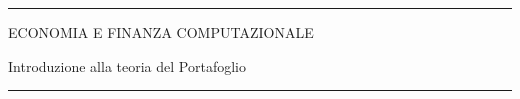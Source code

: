\documentclass[12pt,aspectratio=169]{beamer}
\begin{document}
\begin{frame}
\unitlength 5mm

\begin{center}

\rule{\textwidth}{2pt}

\vskip3mm
ECONOMIA E FINANZA COMPUTAZIONALE

Introduzione alla teoria del Portafoglio
\rule{\textwidth}{2pt}

\end{center}

\end{frame}


\end{document}
